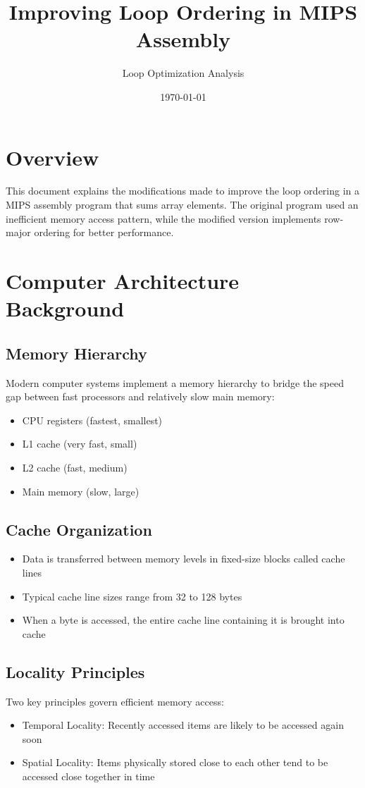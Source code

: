 \documentclass{article}
\title{Improving Loop Ordering in MIPS Assembly}
\author{Loop Optimization Analysis}
\date{\today}
\begin{document}
\maketitle

\section{Overview}
This document explains the modifications made to improve the loop ordering in a MIPS assembly program that sums array elements. The original program used an inefficient memory access pattern, while the modified version implements row-major ordering for better performance.

\section{Computer Architecture Background}

\subsection{Memory Hierarchy}
Modern computer systems implement a memory hierarchy to bridge the speed gap between fast processors and relatively slow main memory:
\begin{itemize}
    \item CPU registers (fastest, smallest)
    \item L1 cache (very fast, small)
    \item L2 cache (fast, medium)
    \item Main memory (slow, large)
\end{itemize}

\subsection{Cache Organization}
\begin{itemize}
    \item Data is transferred between memory levels in fixed-size blocks called cache lines
    \item Typical cache line sizes range from 32 to 128 bytes
    \item When a byte is accessed, the entire cache line containing it is brought into cache
\end{itemize}

\subsection{Locality Principles}
Two key principles govern efficient memory access:
\begin{itemize}
    \item Temporal Locality: Recently accessed items are likely to be accessed again soon
    \item Spatial Locality: Items physically stored close to each other tend to be accessed close together in time
\end{itemize}
\end{document}
